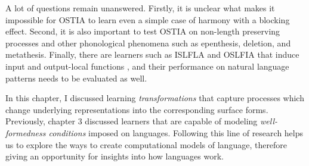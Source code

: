 A lot of questions remain unanswered.
Firstly, it is unclear what makes it impossible for OSTIA to learn even a simple case of harmony with a blocking effect.
Second, it is also important to test OSTIA on non-length preserving processes and other phonological phenomena such as epenthesis, deletion, and metathesis.
Finally, there are learners such as ISLFLA and OSLFIA that induce input and output-local functions \citep{ChandleeEtAl2014,ChandleeEtAl2015}, and their performance on natural language patterns needs to be evaluated as well.


In this chapter, I discussed learning \emph{transformations} that capture processes which change underlying representations into the corresponding surface forms.
Previously, chapter 3 discussed learners that are capable of modeling \emph{well-formedness conditions} imposed on languages.
Following this line of research helps us to explore the ways to create computational models of language, therefore giving an opportunity for insights into how languages work.

